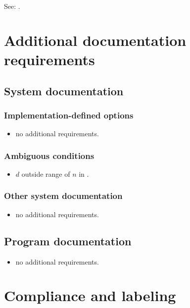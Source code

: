 See: .


\section{Additional documentation requirements} %

\subsection{System documentation} %

\subsubsection{Implementation-defined options} %

\begin{itemize}
\item no additional requirements.
\end{itemize}

\subsubsection{Ambiguous conditions} %

\begin{itemize}
\item $d$ outside range of $n$ in .
\end{itemize}

\subsubsection{Other system documentation} %

\begin{itemize}
\item no additional requirements.
\end{itemize}

\subsection{Program documentation} %

\begin{itemize}
\item no additional requirements.
\end{itemize}


\section{Compliance and labeling} %

